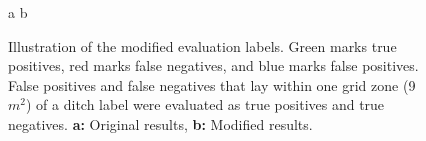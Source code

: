 \documentclass[11pt, review]{elsarticle} %
\begin{document}
\begin{figure} [H]
    \centering
    a{
        }\hspace{5pt}
    b{
        }
    \caption{Illustration of the modified evaluation labels. Green marks true positives, red marks false negatives, and blue marks false positives. False positives and false negatives that lay within one grid zone (9 $m^2$) of a ditch label were evaluated as true positives and true negatives. \textbf{a:} Original results, \textbf{b:} Modified results. }
    \label{fig:newlabels}
\end{figure}
\end{document}
